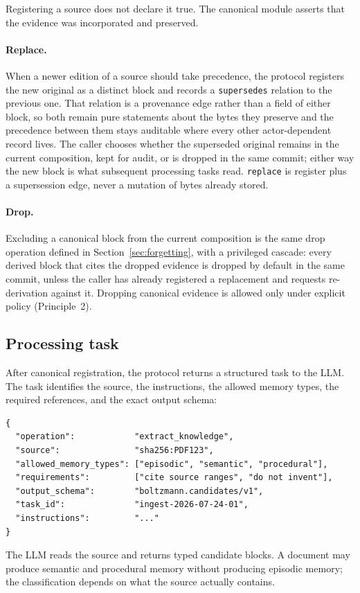 \documentclass[11pt,a4paper]{article}
\begin{document}
Registering a source does not declare it true. The canonical module asserts
that the evidence was incorporated and preserved.

\paragraph{Replace.}
When a newer edition of a source should take precedence, the protocol registers
the new original as a distinct block and records a \texttt{supersedes} relation
to the previous one. That relation is a provenance edge rather than a field of
either block, so both remain pure statements about the bytes they preserve and
the precedence between them stays auditable where every other actor-dependent
record lives. The caller chooses whether the superseded original remains in the current
composition, kept for audit, or is dropped in the same commit; either way the
new block is what subsequent processing tasks read. \texttt{replace} is
register plus a supersession edge, never a mutation of bytes already stored.

\paragraph{Drop.}
Excluding a canonical block from the current composition is the same drop
operation defined in Section~\ref{sec:forgetting}, with a privileged cascade:
every derived block that cites the dropped evidence is dropped by default in
the same commit, unless the caller has already registered a replacement and
requests re-derivation against it. Dropping canonical evidence is allowed only
under explicit policy (Principle~2).

\subsection{Processing task}

After canonical registration, the protocol returns a structured task to the
LLM. The task identifies the source, the instructions, the allowed memory
types, the required references, and the exact output schema:
\begin{verbatim}
{
  "operation":            "extract_knowledge",
  "source":               "sha256:PDF123",
  "allowed_memory_types": ["episodic", "semantic", "procedural"],
  "requirements":         ["cite source ranges", "do not invent"],
  "output_schema":        "boltzmann.candidates/v1",
  "task_id":              "ingest-2026-07-24-01",
  "instructions":         "..."
}
\end{verbatim}
The LLM reads the source and returns typed candidate blocks. A document may
produce semantic and procedural memory without producing episodic memory; the
classification depends on what the source actually contains.
\end{document}
